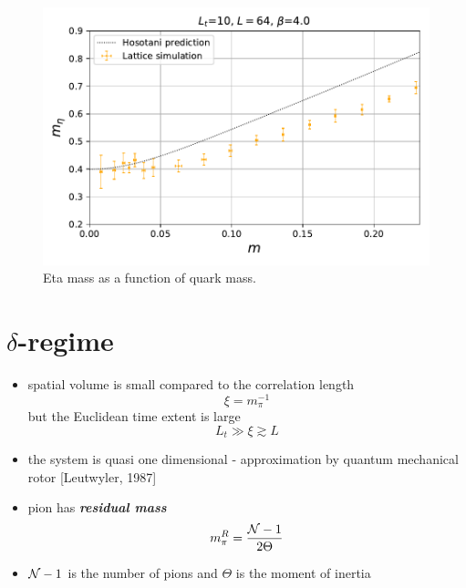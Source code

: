 \documentclass[a4paper,11pt]{article}
\begin{document}
\begin{figure}
  \includegraphics[width=1\textwidth]{figs/Meta64x10FiniteT_Pt3}
  \caption{Eta mass as a function of quark mass.}
\end{figure}


\section{$\delta$-regime}

  \begin{itemize}
    \item spatial volume is small compared to the correlation
      length
      \[
        \xi = m_\pi^{-1}
      \]
      but the Euclidean time extent is large
      \[
        L_t\gg \xi \gtrsim L
      \]
    \item the system is quasi one dimensional - approximation by
      quantum mechanical rotor [Leutwyler, 1987]
    \item pion has \textbf{\textit{residual mass}}
      \[
        m_\pi^R = \frac{{\cal N} - 1}{2\Theta}
      \]
    \item ${\cal N} - 1$ is the number of pions and $\Theta$ is the moment of
      inertia
  \end{itemize}
\end{document}
